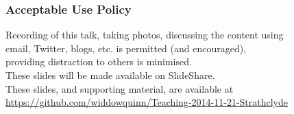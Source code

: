 
%
\begin{frame}
  \frametitle{Acceptable Use Policy}
  Recording of this talk, taking photos, discussing the content using \\
  email, Twitter, blogs, etc. is permitted (and encouraged), \\
  providing distraction to others is minimised. \\[0.5cm]
  These slides will be made available on SlideShare. \\[0.5cm]
  These slides, and supporting material, are available at \href{https://github.com/widdowquinn/Teaching-2014-11-21-Strathclyde}{https://github.com/widdowquinn/Teaching-2014-11-21-Strathclyde}
\end{frame}
